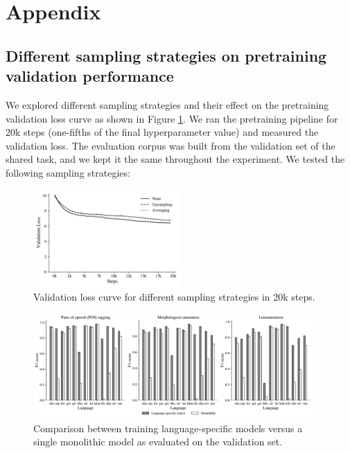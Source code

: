 \documentclass[11pt]{article}
\begin{document}


\appendix

\section{Appendix}
\label{sec:appendix}

\subsection{Different sampling strategies on pretraining validation performance}
\label{sec:appendix_sampling}

We explored different sampling strategies and their effect on the pretraining validation loss curve as shown in Figure \ref{fig:effect_sampling}.
We ran the pretraining pipeline for 20k steps (one-fifths of the final hyperparameter value) and measured the validation loss.
The evaluation corpus was built from the validation set of the shared task, and we kept it the same throughout the experiment.
We tested the following sampling strategies:

\begin{figure}[t]
  \centering
  \includegraphics[width=0.5\textwidth]{figures/effect_sampling.pdf}
  \caption{Validation loss curve for different sampling strategies in 20k steps.}
  \label{fig:effect_sampling}
\end{figure}


\begin{figure}[t]
  \centering
  \includegraphics[width=0.95\textwidth]{figures/monolithic.pdf}
  \caption{Comparison between training language-specific models versus a single monolithic model as evaluated on the validation set.}
  \label{fig:monolithic}
\end{figure}
\end{document}
